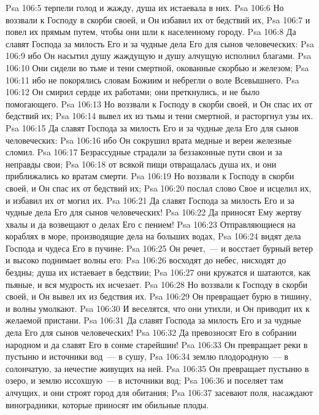 \vs Psa 106:5 терпели голод и жажду, душа их истаевала в них.
\vs Psa 106:6 Но воззвали к Господу в скорби своей, и Он избавил их от бедствий их,
\vs Psa 106:7 и повел их прямым путем, чтобы они шли к населенному городу.
\vs Psa 106:8 Да славят Господа за милость Его и за чудные дела Его для сынов человеческих:
\vs Psa 106:9 ибо Он насытил душу жаждущую и душу алчущую исполнил благами.
\vs Psa 106:10 Они сидели во тьме и тени смертной, окованные скорбью и железом;
\vs Psa 106:11 ибо не покорялись словам Божиим и небрегли о воле Всевышнего.
\vs Psa 106:12 Он смирил сердце их работами; они преткнулись, и не было помогающего.
\vs Psa 106:13 Но воззвали к Господу в скорби своей, и Он спас их от бедствий их;
\vs Psa 106:14 вывел их из тьмы и тени смертной, и расторгнул узы их.
\vs Psa 106:15 Да славят Господа за милость Его и за чудные дела Его для сынов человеческих:
\vs Psa 106:16 ибо Он сокрушил врата медные и вереи железные сломил.
\vs Psa 106:17 Безрассудные страдали за беззаконные пути свои и за неправды свои;
\vs Psa 106:18 от всякой пищи отвращалась душа их, и они приближались ко вратам смерти.
\vs Psa 106:19 Но воззвали к Господу в скорби своей, и Он спас их от бедствий их;
\vs Psa 106:20 послал слово Свое и исцелил их, и избавил их от могил их.
\vs Psa 106:21 Да славят Господа за милость Его и за чудные дела Его для сынов человеческих!
\vs Psa 106:22 Да приносят Ему жертву хвалы и да возвещают о делах Его с пением!
\vs Psa 106:23 Отправляющиеся на кораблях в море, производящие дела на больших водах,
\vs Psa 106:24 видят дела Господа и чудеса Его в пучине:
\vs Psa 106:25 Он речет,~--- и восстает бурный ветер и высоко поднимает волны его:
\vs Psa 106:26 восходят до небес, нисходят до бездны; душа их истаевает в бедствии;
\vs Psa 106:27 они кружатся и шатаются, как пьяные, и вся мудрость их исчезает.
\vs Psa 106:28 Но воззвали к Господу в скорби своей, и Он вывел их из бедствия их.
\vs Psa 106:29 Он превращает бурю в тишину, и волны умолкают.
\vs Psa 106:30 И веселятся, что они утихли, и Он приводит их к желаемой пристани.
\vs Psa 106:31 Да славят Господа за милость Его и за чудные дела Его для сынов человеческих!
\vs Psa 106:32 Да превозносят Его в собрании народном и да славят Его в сонме старейшин!
\vs Psa 106:33 Он превращает реки в пустыню и источники вод~--- в сушу,
\vs Psa 106:34 землю плодородную~--- в солончатую, за нечестие живущих на ней.
\vs Psa 106:35 Он превращает пустыню в озеро, и землю иссохшую~--- в источники вод;
\vs Psa 106:36 и поселяет там алчущих, и они строят город для обитания;
\vs Psa 106:37 засевают поля, насаждают виноградники, которые приносят им обильные плоды.
